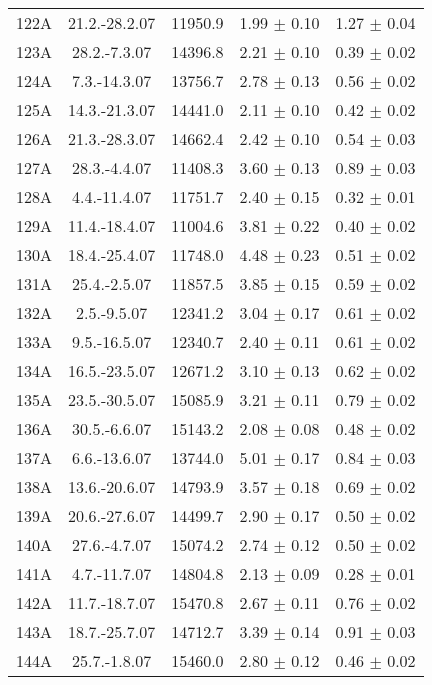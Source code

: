 \documentclass[a4paper,12pt]{article}
\begin{document}
\begin{center}
\begin{longtable}{|c|c|c|c|c|}
    122A	&	21.2.-28.2.07	&	11950.9	&	1.99 $\pm$ 0.10	&	1.27 $\pm$ 0.04	\\
    123A	&	28.2.-7.3.07	&	14396.8	&	2.21 $\pm$ 0.10	&	0.39 $\pm$ 0.02	\\
    124A	&	7.3.-14.3.07	&	13756.7	&	2.78 $\pm$ 0.13	&	0.56 $\pm$ 0.02	\\
    125A	&	14.3.-21.3.07	&	14441.0	&	2.11 $\pm$ 0.10	&	0.42 $\pm$ 0.02	\\
    126A	&	21.3.-28.3.07	&	14662.4	&	2.42 $\pm$ 0.10	&	0.54 $\pm$ 0.03	\\
    127A	&	28.3.-4.4.07	&	11408.3	&	3.60 $\pm$ 0.13	&	0.89 $\pm$ 0.03	\\
    128A	&	4.4.-11.4.07	&	11751.7	&	2.40 $\pm$ 0.15	&	0.32 $\pm$ 0.01	\\
    129A	&	11.4.-18.4.07	&	11004.6	&	3.81 $\pm$ 0.22	&	0.40 $\pm$ 0.02	\\
    130A	&	18.4.-25.4.07	&	11748.0	&	4.48 $\pm$ 0.23	&	0.51 $\pm$ 0.02	\\
    131A	&	25.4.-2.5.07	&	11857.5	&	3.85 $\pm$ 0.15	&	0.59 $\pm$ 0.02	\\
    132A	&	2.5.-9.5.07	&	12341.2	&	3.04 $\pm$ 0.17	&	0.61 $\pm$ 0.02	\\
    133A	&	9.5.-16.5.07	&	12340.7	&	2.40 $\pm$ 0.11	&	0.61 $\pm$ 0.02	\\
    134A	&	16.5.-23.5.07	&	12671.2	&	3.10 $\pm$ 0.13	&	0.62 $\pm$ 0.02	\\
    135A	&	23.5.-30.5.07	&	15085.9	&	3.21 $\pm$ 0.11	&	0.79 $\pm$ 0.02	\\
    136A	&	30.5.-6.6.07	&	15143.2	&	2.08 $\pm$ 0.08	&	0.48 $\pm$ 0.02	\\
    137A	&	6.6.-13.6.07	&	13744.0	&	5.01 $\pm$ 0.17	&	0.84 $\pm$ 0.03	\\
    138A	&	13.6.-20.6.07	&	14793.9	&	3.57 $\pm$ 0.18	&	0.69 $\pm$ 0.02	\\
    139A	&	20.6.-27.6.07	&	14499.7	&	2.90 $\pm$ 0.17	&	0.50 $\pm$ 0.02	\\
    140A	&	27.6.-4.7.07	&	15074.2	&	2.74 $\pm$ 0.12	&	0.50 $\pm$ 0.02	\\
    141A	&	4.7.-11.7.07	&	14804.8	&	2.13 $\pm$ 0.09	&	0.28 $\pm$ 0.01	\\
    142A	&	11.7.-18.7.07	&	15470.8	&	2.67 $\pm$ 0.11	&	0.76 $\pm$ 0.02	\\
    143A	&	18.7.-25.7.07	&	14712.7	&	3.39 $\pm$ 0.14	&	0.91 $\pm$ 0.03	\\
    144A	&	25.7.-1.8.07	&	15460.0	&	2.80 $\pm$ 0.12	&	0.46 $\pm$ 0.02	\\

\end{longtable}
\end{center}
\end{document}

